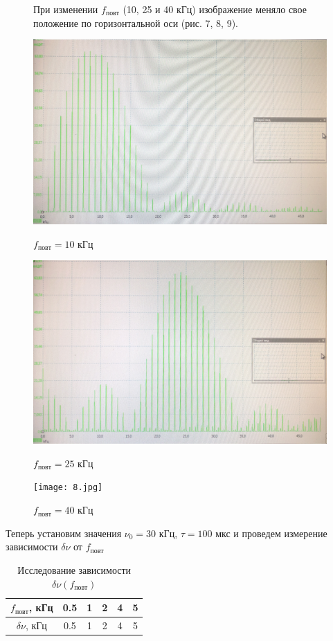 \documentclass[12pt,a4paper]{article}
\begin{document}
\begin{figure}[htp]
    При изменении $f_{повт}$ (10, 25 и 40 кГц) изображение меняло свое положение по горизонтальной оси (рис. 7, 8, 9).
    \newline

    \centering
    \includegraphics[width=0.65\linewidth]{7.jpg}
    \caption[]{$f_{повт} = 10$ кГц}

    \includegraphics[width=0.65\linewidth]{6.jpg}
    \caption[]{$f_{повт} = 25$ кГц}

    \texttt{[image: 8.jpg]}
    \caption[]{$f_{повт} = 40$ кГц}
\end{figure}


\begin{table}[htp]
    Теперь установим значения $\nu_0 = 30$ кГц, $\tau = 100$ мкс и проведем измерение зависимости $\delta \nu$ от $f_{повт}$
    \newline

    \centering
    \begin{tabular}[]{|c|c|c|c|c|c|}
        \hline
        $f_{повт}$, кГц & 0.5& 1& 2& 4& 5\\
        \hline
        $\delta \nu$, кГц & 0.5& 1& 2&4 & 5\\
        \hline
    \end{tabular}
    \caption{Исследование зависимости $\delta \nu(f_{повт})$}
\end{table}
\end{document}
